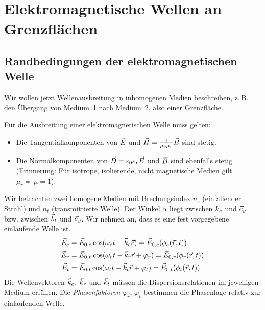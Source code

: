 

\chapter{Elektromagnetische Wellen an Grenzflächen}

\section{Randbedingungen der elektromagnetischen Welle}
Wir wollen jetzt Wellenausbreitung in inhomogenen Medien beschreiben,
z.\,B. den Übergang von Medium~1 nach Medium~2, also einer
Grenzfläche.

Für die Ausbreitung einer elektromagnetischen Welle muss gelten:
\begin{itemize}
\item Die Tangentialkomponenten von $\vec{E}$ und
  $\vec{H}=\frac{1}{\mu_0\mu_r}\vec{B}$ sind stetig. 
\item Die Normalkomponenten von $\vec{D}=\varepsilon_0\varepsilon_r\vec{E}$ und $\vec{B}$ sind
  ebenfalls stetig (Erinnerung: Für isotrope, isolierende, nicht
  magnetische Medien gilt $\mu_r\eqqcolon\mu=1$).
\end{itemize}

 Wir betrachten zwei homogene Medien mit
Brechungsindex $n_e$ (einfallender Strahl) und $n_t$ (transmittierte
Welle).
% 
% 
Der Winkel $\alpha$ liegt zwischen $\vec{k}_e$ und $\vec{e}_y$
bzw. zwischen $\vec{k}_t$ und $\vec{e}_y$. Wir nehmen an, dass es eine
fest vorgegebene einlaufende Welle ist.
\begin{align*}
  \vec{E}_e &= \vec{E}_{0,e}\cos(\omega_et-\vec{k}_e\vec{r})
            =\vec{E}_{0,e}(\phi_e(\vec{r},t))\\
  \vec{E}_r &= \vec{E}_{0,r}\cos(\omega_rt - \vec{k}_r\vec{r}+\varphi_r)
            =\vec{E}_{0,r}(\phi_r(\vec{r},t))\\
  \vec{E}_t &= \vec{E}_{0,t}\cos(\omega_tt - \vec{k}_t\vec{r} + \varphi_t)
            =\vec{E}_{0,t}(\phi_t(\vec{r},t))
\end{align*}
Die Wellenvektoren $\vec{k}_e$, $\vec{k}_r$ und $\vec{k}_t$ müssen die%
%
%
Dispersionsrelationen im jeweiligen Medium erfüllen. Die
\emph{Phasenfaktoren}
$\varphi_r$, $\varphi_t$%
%
bestimmen die Phasenlage relativ zur einlaufenden Welle.

